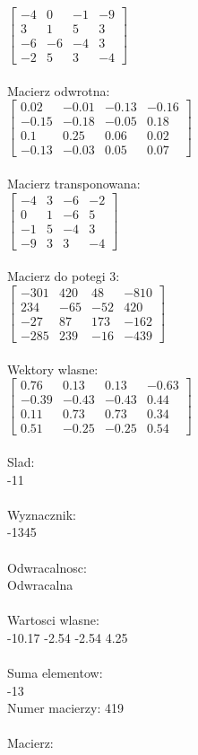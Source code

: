\documentclass[a4paper,12pt]{article}
\begin{document}
$\begin{bmatrix} -4&0&-1&-9\\3&1&5&3\\-6&-6&-4&3\\-2&5&3&-4 \end{bmatrix}$
\\
\\
Macierz odwrotna:\\

$\begin{bmatrix} 0.02&-0.01&-0.13&-0.16\\-0.15&-0.18&-0.05&0.18\\0.1&0.25&0.06&0.02\\-0.13&-0.03&0.05&0.07 \end{bmatrix}$
\\
\\
Macierz transponowana:\\

$\begin{bmatrix} -4&3&-6&-2\\0&1&-6&5\\-1&5&-4&3\\-9&3&3&-4 \end{bmatrix}$
\\
\\
Macierz do potegi 3:\\

$\begin{bmatrix} -301&420&48&-810\\234&-65&-52&420\\-27&87&173&-162\\-285&239&-16&-439 \end{bmatrix}$
\\
\\
Wektory wlasne:\\

$\begin{bmatrix} 0.76&0.13&0.13&-0.63\\-0.39&-0.43&-0.43&0.44\\0.11&0.73&0.73&0.34\\0.51&-0.25&-0.25&0.54 \end{bmatrix}$
\\
\\
Slad:\\
-11
\\
\\
Wyznacznik:\\
-1345
\\
\\
Odwracalnosc:\\
Odwracalna
\\
\\
Wartosci wlasne:\\
-10.17 -2.54 -2.54 4.25
\\
\\
Suma elementow:\\
-13
\\
\newpage
Numer macierzy:
419
\\
\\
Macierz:\\
\end{document}
